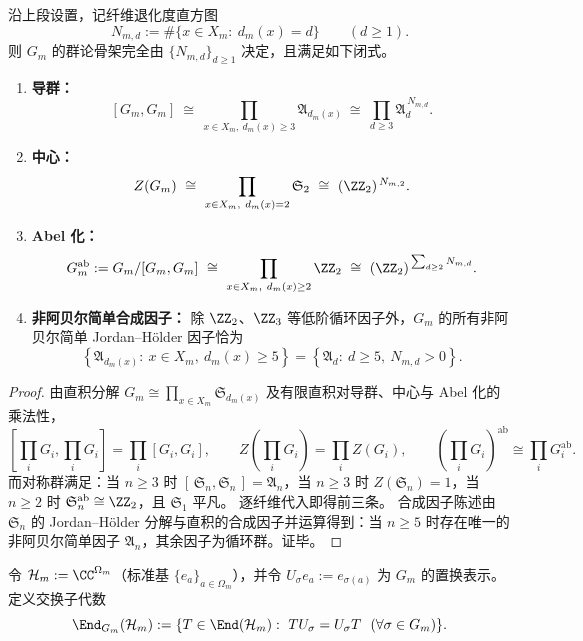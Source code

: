 \begin{proposition}\label{prop:op-algebra-fold-gauge-group-structure}
沿上段设置，记纤维退化度直方图
\[
N_{m,d}:=\#\{x\in X_m:\ d_m(x)=d\}\qquad(d\ge 1).
\]
则 \(G_m\) 的群论骨架完全由 \(\{N_{m,d}\}_{d\ge 1}\) 决定，且满足如下闭式。
\begin{enumerate}
  \item \textbf{导群：}
  \[
  [G_m,G_m]\ \cong\ \prod_{x\in X_m,\ d_m(x)\ge 3}\mathfrak{A}_{d_m(x)}
  \ \cong\ \prod_{d\ge 3}\mathfrak{A}_d^{\,N_{m,d}}.
  \]
  \item \textbf{中心：}
  \[
  Z(G_m)\ \cong\ \prod_{x\in X_m,\ d_m(x)=2}\mathfrak{S}_2
  \ \cong\ (\ZZ_2)^{\,N_{m,2}}.
  \]
  \item \textbf{Abel 化：}
  \[
  G_m^{\mathrm{ab}}
  :=G_m/[G_m,G_m]
  \ \cong\ \prod_{x\in X_m,\ d_m(x)\ge 2}\ZZ_2
  \ \cong\ (\ZZ_2)^{\,\sum_{d\ge 2}N_{m,d}}.
  \]
  \item \textbf{非阿贝尔简单合成因子：}
  除 \(\ZZ_2\)、\(\ZZ_3\) 等低阶循环因子外，\(G_m\) 的所有非阿贝尔简单 Jordan--H\"older 因子恰为
  \[
  \left\{\mathfrak{A}_{d_m(x)}:\ x\in X_m,\ d_m(x)\ge 5\right\}
  =
  \left\{\mathfrak{A}_d:\ d\ge 5,\ N_{m,d}>0\right\}.
  \]
\end{enumerate}
\end{proposition}
\begin{proof}
由直积分解 \(G_m\cong\prod_{x\in X_m}\mathfrak S_{d_m(x)}\) 及有限直积对导群、中心与 Abel 化的乘法性，
\[
[\textstyle\prod_i G_i,\prod_i G_i]=\prod_i[G_i,G_i],\qquad
Z(\textstyle\prod_i G_i)=\prod_i Z(G_i),\qquad
(\textstyle\prod_i G_i)^{\mathrm{ab}}\cong\prod_i G_i^{\mathrm{ab}}.
\]
而对称群满足：当 \(n\ge 3\) 时 \([\,\mathfrak S_n,\mathfrak S_n\,]=\mathfrak A_n\)，当 \(n\ge 3\) 时 \(Z(\mathfrak S_n)=1\)，当 \(n\ge 2\) 时 \(\mathfrak S_n^{\mathrm{ab}}\cong \ZZ_2\)，且 \(\mathfrak S_1\) 平凡。
逐纤维代入即得前三条。
合成因子陈述由 \(\mathfrak S_n\) 的 Jordan--H\"older 分解与直积的合成因子并运算得到：当 \(n\ge 5\) 时存在唯一的非阿贝尔简单因子 \(\mathfrak A_n\)，其余因子为循环群。证毕。
\end{proof}


令 \(\mathcal H_m:=\CC^{\Omega_m}\)（标准基 \(\{e_a\}_{a\in\Omega_m}\)），并令 \(U_\sigma e_a:=e_{\sigma(a)}\) 为 \(G_m\) 的置换表示。
定义交换子代数
\[
\End_{G_m}(\mathcal H_m):=\{T\in\End(\mathcal H_m):\ TU_\sigma=U_\sigma T\ \ (\forall\sigma\in G_m)\}.
\]

